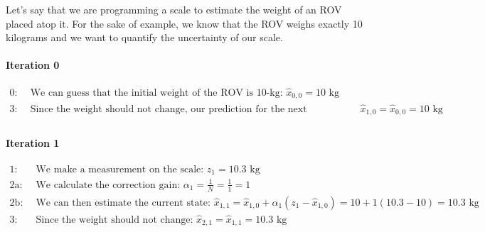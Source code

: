         \begin{example} \label{ex:alpha_filter}
        Let's say that we are programming a scale to estimate the weight of an ROV placed atop it.
        For the sake of example, we know that the ROV weighs exactly 10 kilograms and we want to quantify the uncertainty of our scale.
        \paragraph{Iteration 0}
        \begin{equation*}
            \begin{aligned} 
                0:& \text{ We can guess that the initial weight of the ROV is 10-kg: } \hat{x}_{0,0} = 10 \text{ kg} \\
                3:& \text{ Since the weight should not change, our prediction for the next measurement is: } \hat{x}_{1,0} = \hat{x}_{0,0} = 10 \text{ kg} \\
            \end{aligned}
        \end{equation*}
        
        \paragraph{Iteration 1}
        \begin{equation*}
            \begin{aligned} 
                1:& \text{ We make a measurement on the scale: } z_1 = 10.3 \text{ kg} \\
                2\text{a}:& \text{ We calculate the correction gain: } \alpha_1 = \frac{1}{N} = \frac{1}{1} = 1 \\
                2\text{b}:& \text{ We can then estimate the current state: } \hat{x}_{1,1} = \hat{x}_{1,0} + \alpha_1(z_1 - \hat{x}_{1,0}) = 10 + 1(10.3 - 10) = 10.3 \text{ kg} \\
                3:& \text{ Since the weight should not change: } \hat{x}_{2,1} = \hat{x}_{1,1} = 10.3 \text{ kg} \\
            \end{aligned}
        \end{equation*}


\end{example}

